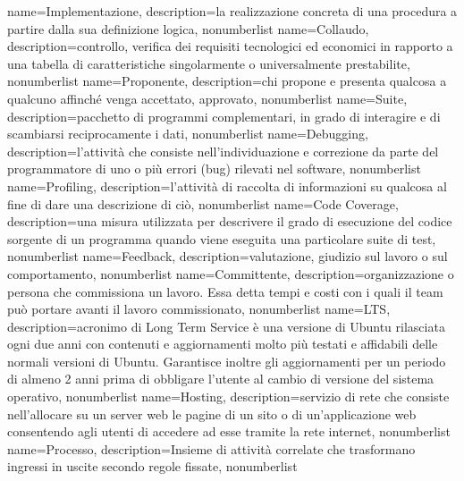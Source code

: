 
\usepackage{glossaries}
\usepackage[utf8x]{inputenc}
\usepackage[italian]{babel}

\makeglossaries

{
	name={Implementazione},
	description={la realizzazione concreta di una procedura a partire dalla sua definizione logica},
	nonumberlist 
}
{
	name={Collaudo},
	description={controllo, verifica dei requisiti tecnologici ed economici in rapporto a una tabella di caratteristiche singolarmente o universalmente prestabilite},
	nonumberlist 
}
{
	name={Proponente},
	description={chi propone e presenta qualcosa a qualcuno affinché venga accettato, approvato},
	nonumberlist 
}
{
	name={Suite},
	description={pacchetto di programmi complementari, in grado di interagire e di scambiarsi reciprocamente i dati},
	nonumberlist 
}
{
	name={Debugging},
	description={l'attività che consiste nell'individuazione e correzione da parte del programmatore di uno o più errori (bug) rilevati nel software},
	nonumberlist 
}
{
	name={Profiling},
	description={l'attività di raccolta di informazioni su qualcosa al fine di dare una descrizione di ciò},
	nonumberlist 
}
{
	name={Code Coverage},
	description={una misura utilizzata per descrivere il grado di esecuzione del codice sorgente di un programma quando viene eseguita una particolare suite di test},
	nonumberlist 
}
{
	name={Feedback},
	description={valutazione, giudizio sul lavoro o sul comportamento},
	nonumberlist 
}
{
	name={Committente},
	description={organizzazione o persona che commissiona un lavoro. Essa detta tempi e costi con i quali il team può portare avanti il lavoro commissionato},
	nonumberlist 
}
{
	name={LTS},
	description={acronimo di Long Term Service è una versione di Ubuntu rilasciata ogni due anni con contenuti e aggiornamenti molto più testati e affidabili delle normali versioni di Ubuntu. Garantisce inoltre gli aggiornamenti per un periodo di almeno 2 anni prima di obbligare l'utente al cambio di versione del sistema operativo},
	nonumberlist 
}
{
	name={Hosting},
	description={servizio di rete che consiste nell'allocare su un server web le pagine di un sito o di un'applicazione web consentendo agli utenti di accedere ad esse tramite la rete internet},
	nonumberlist 
}
{
	name={Processo},
	description={Insieme di attività correlate che trasformano ingressi in uscite secondo regole fissate},
	nonumberlist 
}

